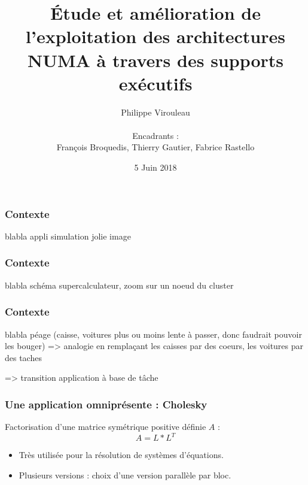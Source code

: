\documentclass[xcolor={usenames,dvipsnames,svgnames,table}, aspectratio=43]{beamer}
\title[Soutenance de thèse]{Étude et amélioration de l'exploitation des architectures NUMA à travers des supports exécutifs
  \vspace{-25pt}
}
\author[Philippe Virouleau]{
Philippe Virouleau\\
  ~\\
\small Encadrants :\\
François Broquedis, Thierry Gautier, Fabrice Rastello}
\institute[CORSE/AVALON]{Inria - CORSE/AVALON teams}
\date{5 Juin 2018}
\begin{document}








\mymaketitle

\begin{frame}
\frametitle{Contexte}
blabla appli simulation jolie image
\end{frame}

\begin{frame}
\frametitle{Contexte}
blabla schéma supercalculateur, zoom sur un noeud du cluster
\end{frame}

\begin{frame}
\frametitle{Contexte}
blabla péage (caisse, voitures plus ou moins lente à passer, donc faudrait pouvoir les bouger)
=> analogie en remplaçant les caisses par des coeurs, les voitures par des taches

=> transition application à base de tâche
\end{frame}

\begin{frame}
\frametitle{Une application omniprésente : Cholesky}

Factorisation d'une matrice symétrique positive définie $A$ : 
$$ A = L*L^T$$

\begin{itemize}
\item Très utilisée pour la résolution de systèmes d'équations.

\item Plusieurs versions : choix d'une version parallèle par bloc.
\end{itemize}

\end{frame}
\end{document}
